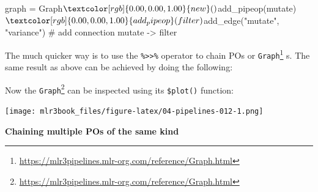 \documentclass[12pt,]{scrbook}
\newenvironment{Shaded}{}{}
\newcommand{\CommentTok}[1]{\textcolor[rgb]{0.00,0.50,0.00}{#1}}
\newcommand{\DataTypeTok}[1]{#1}
\newcommand{\KeywordTok}[1]{\textcolor[rgb]{0.00,0.00,1.00}{#1}}
\newcommand{\NormalTok}[1]{#1}
\newcommand{\OperatorTok}[1]{#1}
\newcommand{\OtherTok}[1]{\textcolor[rgb]{1.00,0.25,0.00}{#1}}
\newcommand{\StringTok}[1]{\textcolor[rgb]{0.00,0.50,0.50}{#1}}
\renewcommand{\href}[2]{#2\footnote{\url{#1}}}
\begin{document}
\begin{Shaded}
\end{Shaded}

\begin{Shaded}
\begin{Highlighting}[]
\NormalTok{graph =}\StringTok{ }\NormalTok{Graph}\OperatorTok{$}\KeywordTok{new}\NormalTok{()}\OperatorTok{$}\KeywordTok{add_pipeop}\NormalTok{(mutate)}\OperatorTok{$}\KeywordTok{add_pipeop}\NormalTok{(filter)}\OperatorTok{$}\KeywordTok{add_edge}\NormalTok{(}\StringTok{"mutate"}\NormalTok{, }
  \StringTok{"variance"}\NormalTok{)  }\CommentTok{# add connection mutate -> filter}
\end{Highlighting}
\end{Shaded}

The much quicker way is to use the \texttt{\%\textgreater{}\textgreater{}\%} operator to chain POs or \href{https://mlr3pipelines.mlr-org.com/reference/Graph.html}{\texttt{Graph}} s.
The same result as above can be achieved by doing the following:

\begin{Shaded}
\end{Shaded}

Now the \href{https://mlr3pipelines.mlr-org.com/reference/Graph.html}{\texttt{Graph}} can be inspected using its \texttt{\$plot()} function:

\begin{Shaded}
\end{Shaded}

\texttt{[image: mlr3book\_files/figure-latex/04-pipelines-012-1.png]}

\textbf{Chaining multiple POs of the same kind}
\end{document}
